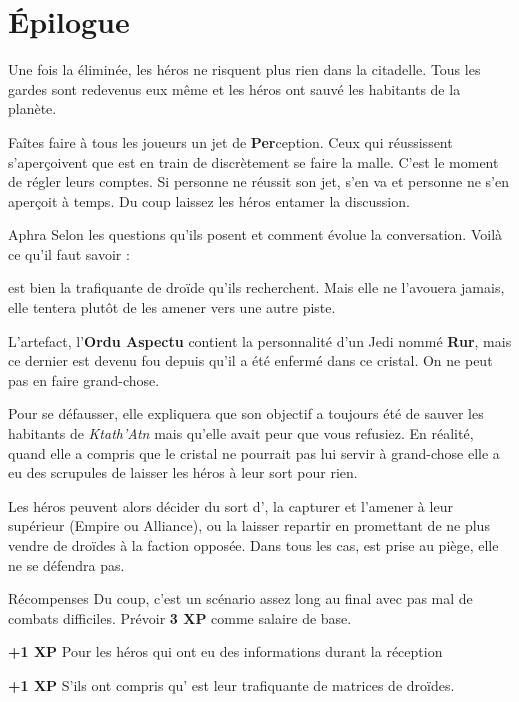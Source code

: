\section{\'Epilogue}

Une fois la  éliminée, les héros ne risquent plus rien dans la citadelle. Tous les gardes sont redevenus eux même et les héros ont sauvé les habitants de la planète.

Faîtes faire à tous les joueurs un jet de \textbf{Per}ception. Ceux qui réussissent s’aperçoivent que  est en train de discrètement se faire la malle. C’est le moment de régler leurs comptes. Si personne ne réussit son jet,  s’en va et personne ne s’en aperçoit à temps.
Du coup laissez les héros entamer la discussion.

\begin{paperbox}{Aphra}
Selon les questions qu’ils posent et comment évolue la conversation. Voilà ce qu’il faut savoir :

\begin{rebelist}
    \item {} est bien la trafiquante de droïde qu’ils recherchent. Mais elle ne l’avouera jamais, elle tentera plutôt de les amener vers une autre piste.
    \item L’artefact, l’\textbf{Ordu Aspectu} contient la personnalité d’un Jedi nommé \textbf{Rur}, mais ce dernier est devenu fou depuis qu’il a été enfermé dans ce cristal. On ne peut pas en faire grand-chose.
    \item Pour se défausser, elle expliquera que son objectif a toujours été de sauver les habitants de \textit{Ktath'Atn} mais qu’elle avait peur que vous refusiez. En réalité, quand elle a compris que le cristal ne pourrait pas lui servir à grand-chose elle a eu des scrupules de laisser les héros à leur sort pour rien.
\end{rebelist}
\end{paperbox}

Les héros peuvent alors décider du sort d’, la capturer et l’amener à leur supérieur (Empire ou Alliance), ou la laisser repartir en promettant de ne plus vendre de droïdes à la faction opposée. Dans tous les cas,  est prise au piège, elle ne se défendra pas.

\begin{paperbox}{Récompenses}
Du coup, c’est un scénario assez long au final avec pas mal de combats difficiles. Prévoir \textbf{3 XP} comme salaire de base.
\begin{rebelist}
    \item \textbf{+1 XP} Pour les héros qui ont eu des informations durant la réception
    \item \textbf{+1 XP} S’ils ont compris qu’ est leur trafiquante de matrices de droïdes.
\end{rebelist}
\end{paperbox}